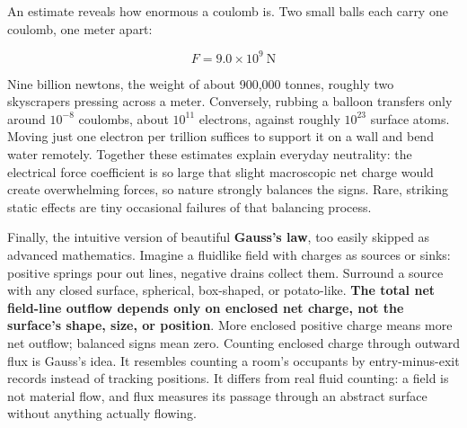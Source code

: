 \begin{mainline}
An estimate reveals how enormous a coulomb is. Two small balls each carry one coulomb, one meter apart:

\[ F = 9.0\times10^{9}\ \mathrm{N} \]

Nine billion newtons, the weight of about 900,000 tonnes, roughly two skyscrapers pressing across a meter. Conversely, rubbing a balloon transfers only around \(10^{-8}\) coulombs, about \(10^{11}\) electrons, against roughly \(10^{23}\) surface atoms. Moving just one electron per trillion suffices to support it on a wall and bend water remotely. Together these estimates explain everyday neutrality: the electrical force coefficient is so large that slight macroscopic net charge would create overwhelming forces, so nature strongly balances the signs. Rare, striking static effects are tiny occasional failures of that balancing process.

Finally, the intuitive version of beautiful \textbf{Gauss's law}, too easily skipped as advanced mathematics. Imagine a fluidlike field with charges as sources or sinks: positive springs pour out lines, negative drains collect them. Surround a source with any closed surface, spherical, box-shaped, or potato-like. \textbf{The total net field-line outflow depends only on enclosed net charge, not the surface's shape, size, or position}. More enclosed positive charge means more net outflow; balanced signs mean zero. Counting enclosed charge through outward flux is Gauss's idea. It resembles counting a room's occupants by entry-minus-exit records instead of tracking positions. It differs from real fluid counting: a field is not material flow, and flux measures its passage through an abstract surface without anything actually flowing.
\end{mainline}

